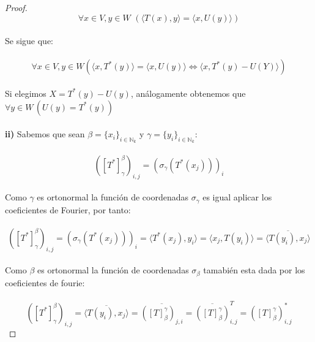 \documentclass[11pt,letterpaper]{article}
\newcommand{\N}{\mathbb{N}}
\begin{document}
\begin{proof}
\begin{equation*}
    \forall x\in V,y\in W\,\,(\langle T(x),y\rangle=\langle x, U(y)\rangle)
\end{equation*}\,\\
Se sigue que:\,\\
\,\\
\begin{equation*}
    \forall x\in V,y\in W(\langle x,T^*(y) \rangle=\langle x,U(y) \rangle \iff \langle x,T^{*}(y)-U(Y) \rangle)
\end{equation*}\,\\
Si elegimos $X=T^{*}(y)-U(y)$, an\'alogamente obtenemos que $\forall y\in W\,(U(y)=T^{*}(y))$
\,\\
\,\\
\textbf{ii)}\,\,Sabemos que sean $\beta=\{x_i\}_{i\in \N_k}$ y $\gamma=\{y_i\}_{i\in \N_k}$:\,\\
\,\\
\begin{equation*}
   ( [T^*]_{\gamma}^{\beta})_{i,j}=(\sigma_{\gamma}(T^*(x_j)))_{i}
\end{equation*}\,\\
Como $\gamma$ es ortonormal la funci\'on de coordenadas $\sigma_{\gamma}$ es igual aplicar los coeficientes de Fourier, por tanto:\,\\
\,\\
\begin{equation*}
   ( [T^*]_{\gamma}^{\beta})_{i,j}=(\sigma_{\gamma}(T^*(x_j)))_{i}=\langle T^{*}(x_j),y_i \rangle=\langle x_j,T(y_i) \rangle=\overline{\langle T(y_i),x_j \rangle}
\end{equation*}\,\\
Como $\beta$ es ortonormal la funci\'on de coordenadas $\sigma_{\beta}$ tamabi\'en esta dada por los coeficientes de fourie:\,\\
\,\\
\begin{equation*}
   ( [T^*]_{\gamma}^{\beta})_{i,j}=\overline{\langle T(y_i),x_j \rangle}=\overline{([T]_{\beta}^{\gamma})_{j,i}}=\overline{([T]_{\beta}^{\gamma})}^T_{i,j}=([T]_{\beta}^{\gamma})^{*}_{i,j}
\end{equation*}
\end{proof}\,\\
\end{document}
